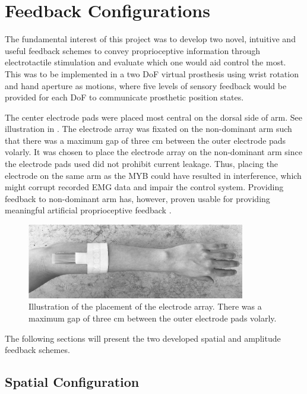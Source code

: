 \section{Feedback Configurations} \label{sec:feed}

The fundamental interest of this project was to develop two novel, intuitive and useful feedback schemes to convey proprioceptive information through electrotactile stimulation and evaluate which one would aid control the most. This was to be implemented in a two DoF virtual prosthesis using wrist rotation and hand aperture as motions, where five levels of sensory feedback would be provided for each DoF to communicate prosthetic position states. 

The center electrode pads were placed most central on the dorsal side of arm. See illustration in . The electrode array was fixated on the non-dominant arm such that there was a maximum gap of three cm between the outer electrode pads volarly. It was chosen to place the electrode array on the non-dominant arm since the electrode pads used did not prohibit current leakage. Thus, placing the electrode on the same arm as the MYB could have resulted in interference, which might corrupt recorded EMG data and impair the control system. Providing feedback to non-dominant arm has, however, proven usable for providing meaningful artificial proprioceptive feedback \cite{Pistohl2015}.  

\begin{figure}[H]                 
	\includegraphics[width=0.85\textwidth]{figures/elec_place}  
	\caption{Illustration of the placement of the electrode array. There was a maximum gap of three cm between the outer electrode pads volarly.}
	\label{fig:meth:elec_place} 
\end{figure} 
The following sections will present the two developed spatial and amplitude feedback schemes. 

\subsection{Spatial Configuration}

